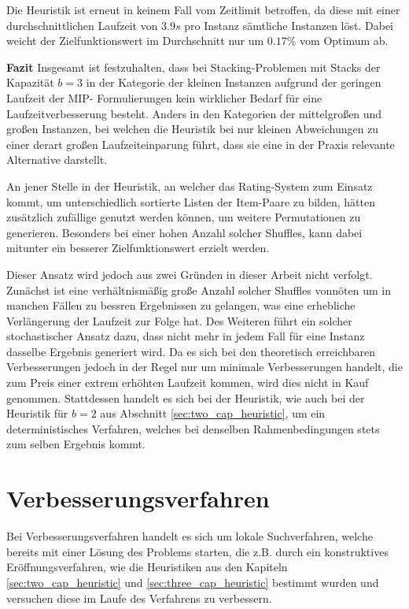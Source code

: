 Die Heuristik ist erneut in keinem Fall vom Zeitlimit betroffen, da diese mit einer durchschnittlichen Laufzeit von
$3.9s$ pro Instanz sämtliche Instanzen löst. Dabei weicht der Zielfunktionswert im Durchschnitt nur um $0.17 \%$ vom
Optimum ab.

\textbf{Fazit}\newline
Insgesamt ist festzuhalten, dass bei Stacking-Problemen mit Stacks der Kapazität
$b = 3$ in der Kategorie der kleinen Instanzen aufgrund der geringen Laufzeit der MIP-
Formulierungen kein wirklicher Bedarf für eine Laufzeitverbesserung besteht. Anders
in den Kategorien der mittelgroßen und großen Instanzen, bei welchen die Heuristik
bei nur kleinen Abweichungen zu einer derart großen Laufzeiteinparung führt, dass sie
eine in der Praxis relevante Alternative darstellt.

An jener Stelle in der Heuristik, an welcher das Rating-System zum Einsatz kommt, um unterschiedlich sortierte
Listen der Item-Paare zu bilden, hätten zusätzlich zufällige  genutzt werden können,
um weitere Permutationen zu generieren. Besonders bei einer hohen Anzahl solcher Shuffles,
kann dabei mitunter ein besserer Zielfunktionswert erzielt werden.

Dieser Ansatz wird jedoch aus zwei Gründen in dieser Arbeit nicht verfolgt.
Zunächst ist eine verhältnismäßig große Anzahl solcher Shuffles vonnöten um in manchen Fällen
zu bessren Ergebnissen zu gelangen, was eine erhebliche Verlängerung der Laufzeit zur Folge hat.
Des Weiteren führt ein solcher stochastischer Ansatz dazu, dass nicht mehr in jedem Fall für eine
Instanz dasselbe Ergebnis generiert wird. Da es sich bei den theoretisch erreichbaren Verbesserungen
jedoch in der Regel nur um minimale Verbesserungen handelt, die zum Preis einer extrem erhöhten Laufzeit
kommen, wird dies nicht in Kauf genommen. Stattdessen handelt es sich bei der Heuristik, wie auch bei der
Heuristik für $b = 2$ aus Abschnitt \ref{sec:two_cap_heuristic}, um ein deterministisches Verfahren,
welches bei denselben Rahmenbedingungen stets zum selben Ergebnis kommt.

\section{Verbesserungsverfahren}
\label{sec:post_optimization}

Bei Verbesserungsverfahren handelt es sich um lokale Suchverfahren, welche bereits mit einer Lösung des Problems starten,
die z.B. durch ein konstruktives Eröffnungsverfahren, wie die Heuristiken aus den Kapiteln \ref{sec:two_cap_heuristic} und \ref{sec:three_cap_heuristic} bestimmt wurden und versuchen diese im Laufe des Verfahrens zu verbessern.

